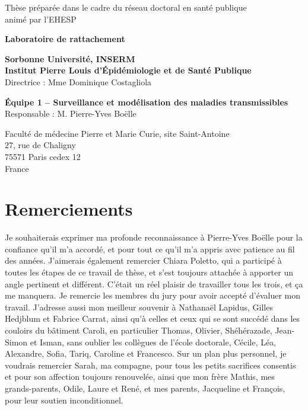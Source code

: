 
\vspace*{4cm}
\begin{center}
Thèse préparée dans le cadre du réseau doctoral en santé publique \\ animé par l’EHESP
\end{center}
\vspace*{4cm}

\begin{center}
\textbf{\Large{Laboratoire de rattachement}}
\vspace{2em}

{\bf Sorbonne Université, INSERM \\ 
Institut Pierre Louis d’Épidémiologie et de Santé Publique} \\
Directrice : Mme Dominique Costagliola

\vspace{2em}
{\bf Équipe 1 -- Surveillance et modélisation des maladies transmissibles} \\
Responsable : M. Pierre-Yves Boëlle

\vspace{2em}
Faculté de médecine Pierre et Marie Curie, site Saint-Antoine \\
27, rue de Chaligny \\
75571 Paris cedex 12 \\
France
\end{center}

\clearpage
\chapter*{Remerciements}
\vspace{2em}

Je souhaiterais exprimer ma profonde reconnaissance à Pierre-Yves Boëlle pour la confiance qu'il m'a accordé, et pour tout ce qu'il m'a appris avec patience au fil des années. 
J'aimerais également remercier Chiara Poletto, qui a participé à toutes les étapes de ce travail de thèse, et s'est toujours attachée à apporter un angle pertinent et différent. 
C'était un réel plaisir de travailler tous les trois, et ça me manquera. 
Je remercie les membres du jury pour avoir accepté d'évaluer mon travail.
J'adresse aussi mon meilleur souvenir à Nathanaël Lapidus, Gilles Hedjblum et Fabrice Carrat, ainsi qu'à celles et ceux qui se sont succédé dans les couloirs du bâtiment Caroli, en particulier Thomas, Olivier, Shéhérazade, Jean-Simon et Isman, sans oublier les collègues de l'école doctorale, Cécile, Léa, Alexandre, Sofia, Tariq, Caroline et Francesco.
Sur un plan plus personnel, je voudrais remercier Sarah, ma compagne, pour tous les petits sacrifices consentis et pour son affection toujours renouvelée, ainsi que mon frère Mathis, mes grands-parents, Odile, Laure et René, et mes parents, Jacqueline et François, pour leur soutien inconditionnel.



